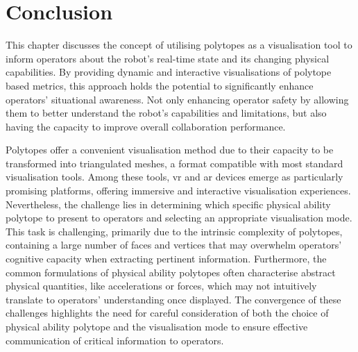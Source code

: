 \section{Conclusion}


This chapter discusses the concept of utilising polytopes as a visualisation tool to inform operators about the robot's real-time state and its changing physical capabilities. By providing dynamic and interactive visualisations of polytope based metrics, this approach holds the potential to significantly enhance operators' situational awareness. Not only enhancing operator safety by allowing them to better understand the robot's capabilities and limitations, but also having the capacity to improve overall collaboration performance. 



Polytopes offer a convenient visualisation method due to their capacity to be transformed into triangulated meshes, a format compatible with most standard visualisation tools. Among these tools, \gls{vr} and \gls{ar} devices emerge as particularly promising platforms, offering immersive and interactive visualisation experiences. Nevertheless, the challenge lies in determining which specific physical ability polytope to present to operators and selecting an appropriate visualisation mode. This task is challenging, primarily due to the intrinsic complexity of polytopes, containing a large number of faces and vertices that may overwhelm operators' cognitive capacity when extracting pertinent information. Furthermore, the common formulations of physical ability polytopes often characterise abstract physical quantities, like accelerations or forces, which may not intuitively translate to operators' understanding once displayed. The convergence of these challenges highlights the need for careful consideration of both the choice of physical ability polytope and the visualisation mode to ensure effective communication of critical information to operators.

